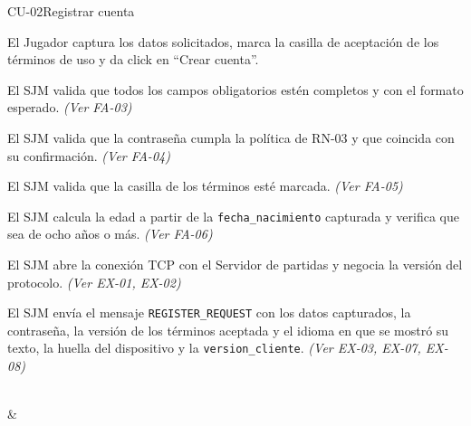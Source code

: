 \begin{fichacu}{CU-02}{Registrar cuenta}
{\begin{cuenum}[start=1]
      \item El Jugador captura los datos solicitados, marca la casilla de aceptación de los términos de uso y da click en ``Crear cuenta''.
      \item El SJM valida que todos los campos obligatorios estén completos y con el formato esperado. \textit{(Ver \mbox{FA-03})}
      \item El SJM valida que la contraseña cumpla la política de \mbox{RN-03} y que coincida con su confirmación. \textit{(Ver \mbox{FA-04})}
      \item El SJM valida que la casilla de los términos esté marcada. \textit{(Ver \mbox{FA-05})}
      \item El SJM calcula la edad a partir de la \texttt{fecha\_\allowbreak{}nacimiento} capturada y verifica que sea de ocho años o más. \textit{(Ver \mbox{FA-06})}
      \item El SJM abre la conexión TCP con el Servidor de partidas y negocia la versión del protocolo. \textit{(Ver \mbox{EX-01}, \mbox{EX-02})}
      \item El SJM envía el mensaje \texttt{REGISTER\_\allowbreak{}REQUEST} con los datos capturados, la contraseña, la versión de los términos aceptada y el idioma en que se mostró su texto, la huella del dispositivo y la \texttt{version\_\allowbreak{}cliente}. \textit{(Ver \mbox{EX-03}, \mbox{EX-07}, \mbox{EX-08})}
    \end{cuenum}} \\
   & 
\end{fichacu}
